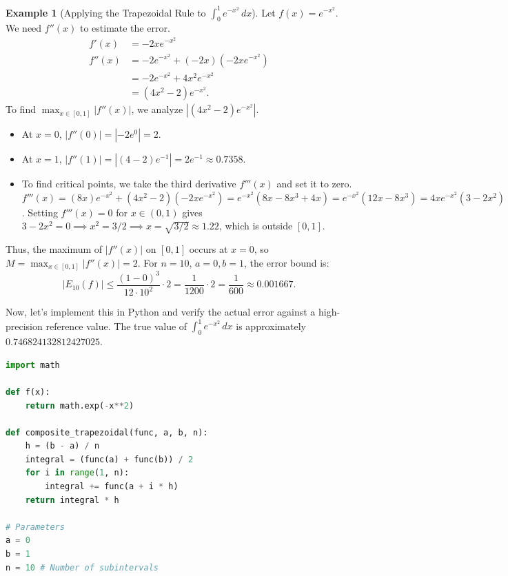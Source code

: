 \documentclass[11pt, a4paper]{article}
\theoremstyle{plain} %
\theoremstyle{definition} %
\newtheorem{example}[theorem]{Example}
\theoremstyle{remark} %
\begin{document}
\begin{example}[Applying the Trapezoidal Rule to \( \int_0^1 e^{-x^2} \, dx \)]
    Let \( f(x) = e^{-x^2} \). We need \( f''(x) \) to estimate the error.
    \begin{align*}
        f'(x) &= -2xe^{-x^2} \\
        f''(x) &= -2e^{-x^2} + (-2x)(-2xe^{-x^2}) \\
                &= -2e^{-x^2} + 4x^2e^{-x^2} \\
                &= (4x^2 - 2)e^{-x^2}.
    \end{align*}
    To find \( \max_{x \in [0,1]} |f''(x)| \), we analyze \( |(4x^2 - 2)e^{-x^2}| \).
    \begin{itemize}
        \item At \( x=0 \), \( |f''(0)| = |-2e^0| = 2 \).
        \item At \( x=1 \), \( |f''(1)| = |(4-2)e^{-1}| = 2e^{-1} \approx 0.7358 \).
        \item To find critical points, we take the third derivative \( f'''(x) \) and set it to zero.
        \( f'''(x) = (8x)e^{-x^2} + (4x^2-2)(-2xe^{-x^2}) = e^{-x^2}(8x - 8x^3 + 4x) = e^{-x^2}(12x - 8x^3) = 4xe^{-x^2}(3 - 2x^2) \).
        Setting \( f'''(x)=0 \) for \( x \in (0,1) \) gives \( 3 - 2x^2 = 0 \implies x^2 = 3/2 \implies x = \sqrt{3/2} \approx 1.22 \), which is outside \( [0,1] \).
    \end{itemize}
    Thus, the maximum of \( |f''(x)| \) on \( [0,1] \) occurs at \( x=0 \), so \( M = \max_{x \in [0,1]} |f''(x)| = 2 \).
    For \( n=10 \), \( a=0, b=1 \), the error bound is:
    \[ |E_{10}(f)| \le \frac{(1-0)^3}{12 \cdot 10^2} \cdot 2 = \frac{1}{1200} \cdot 2 = \frac{1}{600} \approx 0.001667. \]

    Now, let's implement this in Python and verify the actual error against a high-precision reference value.
    The true value of \( \int_0^1 e^{-x^2} \, dx \) is approximately \( 0.746824132812427025 \).

    \begin{lstlisting}[language=Python, caption=Python implementation of Composite Trapezoidal Rule]
import math

def f(x):
    return math.exp(-x**2)

def composite_trapezoidal(func, a, b, n):
    h = (b - a) / n
    integral = (func(a) + func(b)) / 2
    for i in range(1, n):
        integral += func(a + i * h)
    return integral * h

# Parameters
a = 0
b = 1
n = 10 # Number of subintervals


\end{lstlisting}
\end{example}
\end{document}
